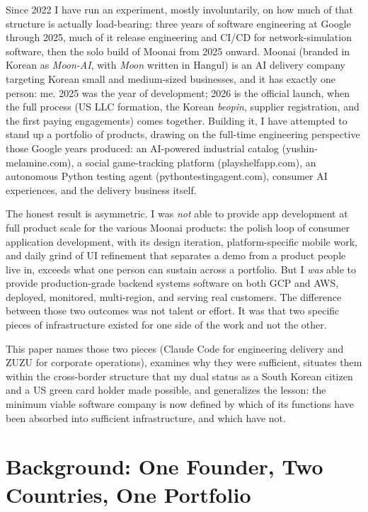 \documentclass{article}
\begin{document}
Since 2022 I have run an experiment, mostly involuntarily, on how much of that structure is actually load-bearing: three years of software engineering at Google through 2025, much of it release engineering and CI/CD for network-simulation software, then the solo build of Moonai from 2025 onward. Moonai (branded in Korean as \emph{Moon-AI}, with \emph{Moon} written in Hangul) is an AI delivery company targeting Korean small and medium-sized businesses, and it has exactly one person: me. 2025 was the year of development; 2026 is the official launch, when the full process (US LLC formation, the Korean \emph{beopin}, supplier registration, and the first paying engagements) comes together. Building it, I have attempted to stand up a portfolio of products, drawing on the full-time engineering perspective those Google years produced: an AI-powered industrial catalog (yushin-melamine.com), a social game-tracking platform (playshelfapp.com), an autonomous Python testing agent (pythontestingagent.com), consumer AI experiences, and the delivery business itself.

The honest result is asymmetric. I was \emph{not} able to provide app development at full product scale for the various Moonai products: the polish loop of consumer application development, with its design iteration, platform-specific mobile work, and daily grind of UI refinement that separates a demo from a product people live in, exceeds what one person can sustain across a portfolio. But I \emph{was} able to provide production-grade backend systems software on both GCP and AWS, deployed, monitored, multi-region, and serving real customers. The difference between those two outcomes was not talent or effort. It was that two specific pieces of infrastructure existed for one side of the work and not the other.

This paper names those two pieces (Claude Code for engineering delivery and ZUZU for corporate operations), examines why they were sufficient, situates them within the cross-border structure that my dual status as a South Korean citizen and a US green card holder made possible, and generalizes the lesson: the minimum viable software company is now defined by which of its functions have been absorbed into sufficient infrastructure, and which have not.

\section{Background: One Founder, Two Countries, One Portfolio}
\end{document}
